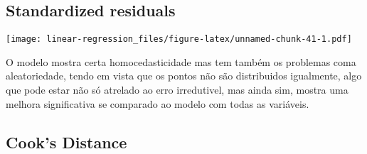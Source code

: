 \documentclass[]{article}
\newenvironment{Shaded}{\begin{snugshade}}{\end{snugshade}}
\newcommand{\KeywordTok}[1]{\textcolor[rgb]{0.13,0.29,0.53}{\textbf{#1}}}
\newcommand{\DataTypeTok}[1]{\textcolor[rgb]{0.13,0.29,0.53}{#1}}
\newcommand{\DecValTok}[1]{\textcolor[rgb]{0.00,0.00,0.81}{#1}}
\newcommand{\StringTok}[1]{\textcolor[rgb]{0.31,0.60,0.02}{#1}}
\newcommand{\OtherTok}[1]{\textcolor[rgb]{0.56,0.35,0.01}{#1}}
\newcommand{\OperatorTok}[1]{\textcolor[rgb]{0.81,0.36,0.00}{\textbf{#1}}}
\newcommand{\NormalTok}[1]{#1}
\begin{document}
\subsection{Standardized residuals}\label{standardized-residuals-2}

\begin{Shaded}
\end{Shaded}

\texttt{[image: linear-regression\_files/figure-latex/unnamed-chunk-41-1.pdf]}

O modelo mostra certa homocedasticidade mas tem também os problemas coma
aleatoriedade, tendo em vista que os pontos não são distribuidos
igualmente, algo que pode estar não só atrelado ao erro irredutivel, mas
ainda sim, mostra uma melhora significativa se comparado ao modelo com
todas as variáveis.

\subsection{Cook's Distance}\label{cooks-distance-2}
\end{document}
